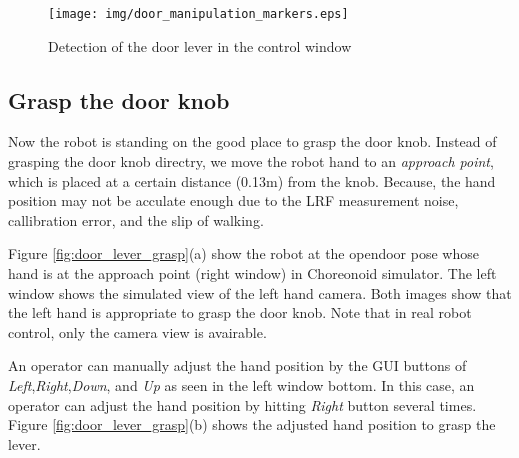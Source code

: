 \begin{figure}[t]
  \centering
  \texttt{[image: img/door\_manipulation\_markers.eps]}
  \caption{Detection of the door lever in the control window}
  \label{fig:door_manip_markers}
\end{figure}
		

\subsection{Grasp the door knob}
%
Now the robot is standing on the good place to grasp the door knob.
Instead of grasping the door knob directry, we move the robot hand to an {\it approach point},
which is placed at a certain distance (0.13m) from the knob. 
Because, the hand position may not be acculate enough due to the LRF measurement noise, callibration error,
and the slip of walking.

Figure \ref{fig:door_lever_grasp}(a) show the robot at the opendoor pose whose hand is at the approach point (right window) in Choreonoid simulator. The left window shows the simulated view of the left hand camera. Both images show that the left hand is appropriate to grasp the door knob. Note that in real robot control, only the camera view is avairable. 

 An operator can manually adjust the hand position by the GUI buttons of 
{\it Left},{\it Right},{\it Down}, and {\it Up} as seen in the left window bottom. In this case, an operator
can adjust the hand position by hitting {\it Right} button several times.
Figure \ref{fig:door_lever_grasp}(b) shows the adjusted hand position to grasp the lever.

